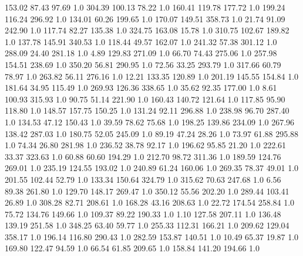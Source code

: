     153.02     87.43     97.69  1.0
    304.39    100.13     78.22  1.0
    160.41    119.78    177.72  1.0
    199.24    116.24    296.92  1.0
    134.01     60.26    199.65  1.0
    170.07    149.51    358.73  1.0
     21.74     91.09    242.90  1.0
    117.74     82.27    135.38  1.0
    324.75    163.08     15.78  1.0
    310.75    102.67    189.82  1.0
    137.78    145.91    340.53  1.0
    118.44     49.57    162.07  1.0
    241.32     57.38    301.12  1.0
    288.09     24.40    281.18  1.0
      4.89    129.83    271.09  1.0
     66.70     74.43    275.06  1.0
    257.98    154.51    238.69  1.0
    350.20     56.81    290.95  1.0
     72.56     33.25    293.79  1.0
    317.66     60.79     78.97  1.0
    263.82     56.11    276.16  1.0
     12.21    133.35    120.89  1.0
    201.19    145.55    154.84  1.0
    181.64     34.95    115.49  1.0
    269.93    126.36    338.65  1.0
     35.62     92.35    177.00  1.0
      8.61    100.93    315.93  1.0
     90.75     51.14    221.90  1.0
    160.43    140.72    121.64  1.0
    117.85     95.90    118.80  1.0
    148.57    157.75    150.25  1.0
    131.24     92.11    296.88  1.0
    238.98     96.70    287.40  1.0
    134.53     47.12    150.43  1.0
     39.59     78.62     75.68  1.0
    198.25    139.86    234.09  1.0
    267.96    138.42    287.03  1.0
    180.75     52.05    245.09  1.0
     89.19     47.24     28.26  1.0
     73.97     61.88    295.88  1.0
     74.34     26.80    281.98  1.0
    236.52     38.78     92.17  1.0
    196.62     95.85     21.20  1.0
    222.61     33.37    323.63  1.0
     60.88     60.60    194.29  1.0
    212.70     98.72    311.36  1.0
    189.59    124.76    269.01  1.0
    235.19    124.55    193.02  1.0
    240.89     61.24    160.06  1.0
    269.35     78.37     49.01  1.0
    201.55    102.44     52.79  1.0
    133.34    150.64    324.79  1.0
    315.62     70.63    247.68  1.0
      6.56     89.38    261.80  1.0
    129.70    148.17    269.47  1.0
    350.12     55.56    202.20  1.0
    289.44    103.41     26.89  1.0
    308.28     82.71    208.61  1.0
    168.28     43.16    208.63  1.0
     22.72    174.54    258.84  1.0
     75.72    134.76    149.66  1.0
    109.37     89.22    190.33  1.0
      1.10    127.58    207.11  1.0
    136.48    139.19    251.58  1.0
    348.25     63.40     59.77  1.0
    255.33    112.31    166.21  1.0
    209.62    129.04    358.17  1.0
    196.14    116.80    290.43  1.0
    282.59    153.87    140.51  1.0
     10.49     65.37     19.87  1.0
    169.80    122.47     94.59  1.0
     66.54     61.85    209.65  1.0
    158.84    141.20    194.66  1.0
